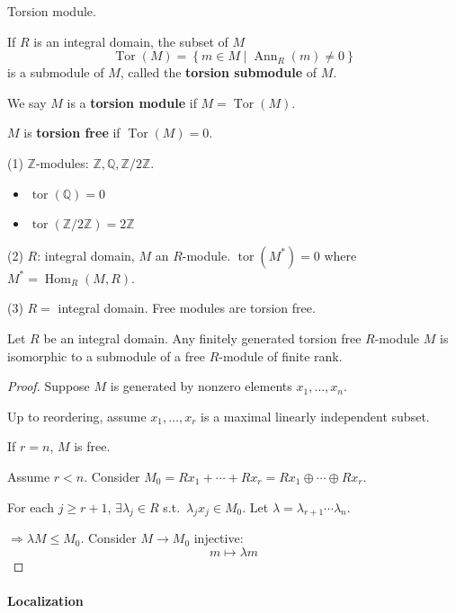 \documentclass[11pt, a4paper]{report}
\begin{document}
\begin{lemma}
Torsion module.

If $R$ is an integral domain, the subset of $M$
\[
\operatorname{Tor}(M) = \left\{m \in M \mid \operatorname{Ann}_{R}(m) \neq 0\right\}
\]
is a submodule of $M$, called the \textbf{torsion submodule} of $M$.

We say $M$ is a \textbf{torsion module} if $M = \operatorname{Tor}(M)$.

$M$ is \textbf{torsion free} if $\operatorname{Tor}(M) = 0$.
\end{lemma}

\begin{example}
(1) $\mathbb{Z}$-modules: $\mathbb{Z}, \mathbb{Q}, \mathbb{Z} / 2 \mathbb{Z}$.
\begin{itemize}
\item $\operatorname{tor}(\mathbb{Q})=0$
\item $\operatorname{tor}(\mathbb{Z} / 2 \mathbb{Z})=2 \mathbb{Z}$
\end{itemize}

(2) $R$: integral domain, $M$ an $R$-module.
$\operatorname{tor}(M^{*})=0$ where $M^{*}=\operatorname{Hom}_{R}(M, R)$.

(3) $R=$ integral domain. Free modules are torsion free.
\end{example}

\begin{proposition}
Let $R$ be an integral domain. Any finitely generated torsion free $R$-module $M$ is isomorphic to a submodule of a free $R$-module of finite rank.
\end{proposition}

\begin{proof}
Suppose $M$ is generated by nonzero elements $x_{1}, \ldots, x_{n}$.

Up to reordering, assume $x_{1}, \ldots, x_{r}$ is a maximal linearly independent subset.

If $r=n$, $M$ is free.

Assume $r<n$. Consider $M_{0}=R x_{1}+\cdots+R x_{r}=R x_{1} \oplus \cdots \oplus R x_{r}$.

For each $j \geqslant r+1$, $\exists \lambda_{j} \in R$ s.t.\ $\lambda_{j} x_{j} \in M_{0}$. Let $\lambda=\lambda_{r+1} \cdots \lambda_{n}$.

$\Rightarrow \lambda M \leq M_{0}$. Consider $M \rightarrow M_{0}$ injective:
\[
m \mapsto \lambda m
\]
\end{proof}

\paragraph{Localization}
\end{document}
